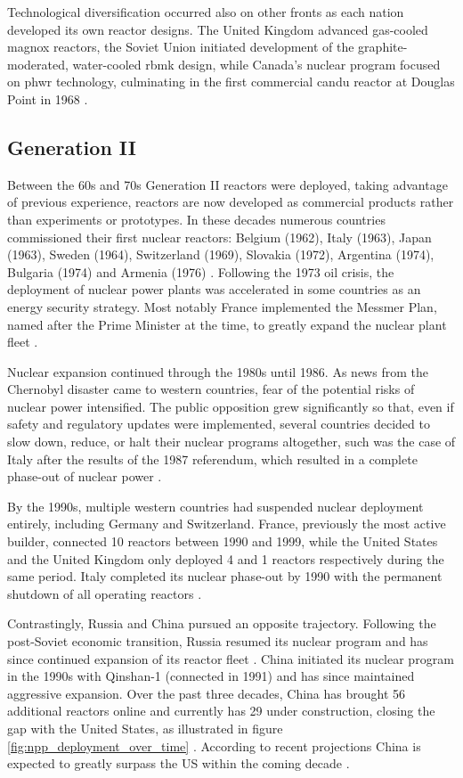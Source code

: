 Technological diversification occurred also on other fronts as each nation developed its own reactor designs. The United Kingdom advanced gas-cooled \acrshort{magnox} reactors, the Soviet Union initiated development of the graphite-moderated, water-cooled \gls{rbmk} design, while Canada's nuclear program focused on \gls{phwr} technology, culminating in the first commercial \acrshort{candu} reactor at Douglas Point in 1968 \cite{IAEA_PRIS_2025}.


\subsection{Generation II}
Between the 60s and 70s Generation II reactors were deployed, taking advantage of previous experience, reactors are now developed as commercial products rather than experiments or prototypes. In these decades numerous countries commissioned their first nuclear reactors: Belgium (1962), Italy (1963), Japan (1963), Sweden (1964), Switzerland (1969), Slovakia (1972), Argentina (1974), Bulgaria (1974) and Armenia (1976) \cite{IAEA_PRIS_2025}. Following the 1973 oil crisis, the deployment of nuclear power plants was accelerated in some countries as an energy security strategy. Most notably France implemented the Messmer Plan, named after the Prime Minister at the time, to greatly expand the nuclear plant fleet \cite{FundingUniverse_EDF_History_2025}. 

Nuclear expansion continued through the 1980s until 1986. As news from the Chernobyl disaster came to western countries, fear of the potential risks of nuclear power intensified. The public opposition grew significantly so that, even if safety and regulatory updates were implemented, several countries decided to slow down, reduce, or halt their nuclear programs altogether, such was the case of Italy after the results of the 1987 referendum, which resulted in a complete phase-out of nuclear power \cite{MinisteroInterno_Referendum_1987, IAEA_PRIS_2025}. 

By the 1990s, multiple western countries had suspended nuclear deployment entirely, including Germany and Switzerland. France, previously the most active builder, connected 10 reactors between 1990 and 1999, while the United States and the United Kingdom only deployed 4 and 1 reactors respectively during the same period. Italy completed its nuclear phase-out by 1990 with the permanent shutdown of all operating reactors \cite{IAEA_PRIS_2025}. 

Contrastingly, Russia and China pursued an opposite trajectory. Following the post-Soviet economic transition, Russia resumed its nuclear program and has since continued expansion of its reactor fleet \cite{IAEA_PRIS_2025}. China initiated its nuclear program in the 1990s with Qinshan-1 (connected in 1991) and has since maintained aggressive expansion. Over the past three decades, China has brought 56 additional reactors online and currently has 29 under construction, closing the gap with the United States, as illustrated in figure \ref{fig:npp_deployment_over_time} \cite{IAEA_PRIS_2025}. According to recent projections China is expected to greatly surpass the US within the coming decade  \cite{WNA_Nuclear_Power_World_2025}.

